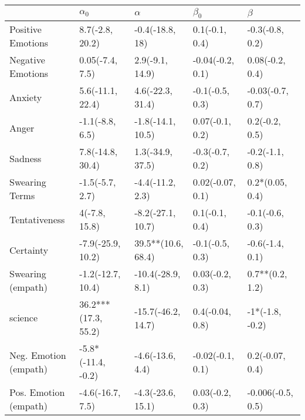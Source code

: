 \begin{tabular}{lllll}
\toprule
{} &           $\alpha_0$ &            $\alpha$ &         $\beta_0$ &            $\beta$ \\
\midrule
Positive Emotions     &      8.7(-2.8, 20.2) &     -0.4(-18.8, 18) &    0.1(-0.1, 0.4) &    -0.3(-0.8, 0.2) \\
Negative Emotions     &      0.05(-7.4, 7.5) &     2.9(-9.1, 14.9) &  -0.04(-0.2, 0.1) &    0.08(-0.2, 0.4) \\
Anxiety               &     5.6(-11.1, 22.4) &    4.6(-22.3, 31.4) &   -0.1(-0.5, 0.3) &   -0.03(-0.7, 0.7) \\
Anger                 &      -1.1(-8.8, 6.5) &   -1.8(-14.1, 10.5) &   0.07(-0.1, 0.2) &     0.2(-0.2, 0.5) \\
Sadness               &     7.8(-14.8, 30.4) &    1.3(-34.9, 37.5) &   -0.3(-0.7, 0.2) &    -0.2(-1.1, 0.8) \\
Swearing Terms        &      -1.5(-5.7, 2.7) &    -4.4(-11.2, 2.3) &  0.02(-0.07, 0.1) &    0.2*(0.05, 0.4) \\
Tentativeness         &        4(-7.8, 15.8) &   -8.2(-27.1, 10.7) &    0.1(-0.1, 0.4) &    -0.1(-0.6, 0.3) \\
Certainty             &    -7.9(-25.9, 10.2) &  39.5**(10.6, 68.4) &   -0.1(-0.5, 0.3) &    -0.6(-1.4, 0.1) \\
Swearing (empath)     &    -1.2(-12.7, 10.4) &   -10.4(-28.9, 8.1) &   0.03(-0.2, 0.3) &    0.7**(0.2, 1.2) \\
science               &  36.2***(17.3, 55.2) &  -15.7(-46.2, 14.7) &   0.4(-0.04, 0.8) &    -1*(-1.8, -0.2) \\
Neg. Emotion (empath) &   -5.8*(-11.4, -0.2) &    -4.6(-13.6, 4.4) &  -0.02(-0.1, 0.1) &    0.2(-0.07, 0.4) \\
Pos. Emotion (empath) &     -4.6(-16.7, 7.5) &   -4.3(-23.6, 15.1) &   0.03(-0.2, 0.3) &  -0.006(-0.5, 0.5) \\
\bottomrule
\end{tabular}
